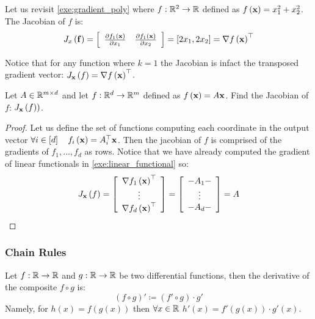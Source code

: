 \begin{example}
Let us revisit \autoref{exe:gradient_poly} where $f:\mathbb{R}^2\rightarrow\mathbb{R}$ defined as $f\left(\mathbf{x}\right)=x_1^2+x_2^2$. The Jacobian of $f$ is:
$$ J_{\\x}\left(\mathbf{f}\right)=\left[\begin{array}{cc}
	\frac{\partial f_1\left(\mathbf{x}\right)}{\partial x_1} & \frac{\partial f_1\left(\mathbf{x}\right)}{\partial x_2}\end{array}\right]=\left[2x_1,2x_2\right]=\nabla f\left(\mathbf{x}\right)^\top $$
\end{example}

Notice that for any function where $k=1$ the Jacobian is infact the transposed gradient vector: $J_{\mathbf{x}}\left(f\right)=\nabla f\left(\mathbf{x}\right)^\top$.

\begin{exercise}\label{exe:lin_jcob}
Let $A\in\mathbb{R}^{m\times d}$ and let $f:\mathbb{R}^d\rightarrow\mathbb{R}^m$ defined as $f\left(\mathbf{x}\right)=A\mathbf{x}$.  Find the Jacobian of $f$: $J_{\mathbf{x}}\left(f)\right)$.
\end{exercise}
\begin{proof}
Let us define the set of functions computing each coordinate in the output vector $\forall i\in\left[d\right]\quad f_i\left(\mathbf{x}\right)=A_i^\top \mathbf{x}$. Then the jacobian of $f$ is comprised of the gradients of $f_1,\ldots, f_d$ as rows. Notice that we have already computed the gradient of linear functionals in \autoref{exe:linear_functional} so:
$$ J_{\mathbf{x}}\left(f\right)=\left[\begin{array}{c}
	\nabla f_{1}\left(\mathbf{x}\right)^{\top}\\
	\vdots\\
	\nabla f_{d}\left(\mathbf{x}\right)^{\top}
\end{array}\right]=\left[\begin{array}{c}
	-A_{1}-\\
	\vdots\\
	-A_{d}-
\end{array}\right]=A $$
\end{proof}

\subsubsection{Chain Rules}
\begin{theorem}
Let $f:\mathbb{R}\to\mathbb{R}$ and $g:\mathbb{R}\to\mathbb{R}$ be two differential functions, then the derivative of the composite $f\circ g$ is: $$ \left(f\circ g\right)' \coloneqq \left(f'\circ g\right)\cdot g' $$
Namely, for $h\left(x\right)=f\left(g\left(x\right)\right)$ then $\forall x\in\mathbb{R}$ $h'\left(x\right)=f'\left(g\left(x\right)\right)\cdot g'\left(x\right)$.
\end{theorem}

